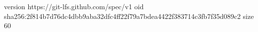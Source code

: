 version https://git-lfs.github.com/spec/v1
oid sha256:2f814b7d76dc4dbb9aba32dfc4ff22f79a7bdea4422f383714c3fb7f35d089c2
size 60
